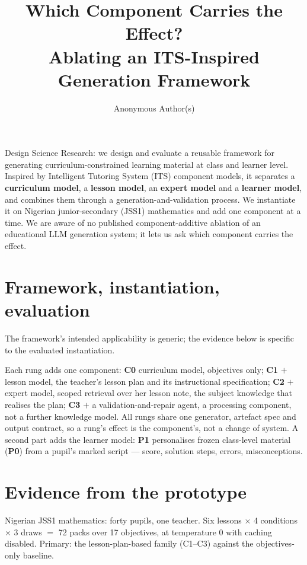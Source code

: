 \documentclass{article}
\title{Which Component Carries the Effect?\\
Ablating an ITS-Inspired Generation Framework}
\author{Anonymous Author(s)}
\begin{document}
\maketitle
\vspace{-2.7em}

\noindent
Design Science Research: we design and evaluate a reusable framework for generating
curriculum-constrained learning material at class and learner level. Inspired by
Intelligent Tutoring System (ITS) component models, it separates a \textbf{curriculum
model}, a \textbf{lesson model}, an \textbf{expert model} and a \textbf{learner model},
and combines them through a generation-and-validation process. We instantiate it on
Nigerian junior-secondary (JSS1) mathematics and add one component at a time. We are aware
of no published component-additive ablation of an educational LLM generation system; it
lets us ask which component carries the effect.

\vspace{-0.78em}
\section{Framework, instantiation, evaluation}
\vspace{-0.52em}
The framework's intended applicability is generic; the evidence below is specific to the
evaluated instantiation.

Each rung adds one component: \textbf{C0} curriculum model, objectives only;
\textbf{C1} $+$ lesson model, the teacher's lesson plan and its instructional
specification; \textbf{C2} $+$ expert model, scoped retrieval over her lesson note, the
subject knowledge that realises the plan; \textbf{C3} $+$ a validation-and-repair agent,
a processing component, not a further knowledge model. All rungs share one
generator, artefact spec and output contract, so a rung's effect is the component's, not a
change of system. A second part adds the learner model:
\textbf{P1} personalises frozen class-level material (\textbf{P0}) from a pupil's marked
script --- score, solution steps, errors, misconceptions.

\vspace{-0.78em}
\section{Evidence from the prototype}
\vspace{-0.52em}
Nigerian JSS1 mathematics: forty pupils, one teacher. Six lessons $\times$ 4 conditions
$\times$ 3 draws $=$ 72 packs over 17 objectives, at
temperature 0 with caching disabled. Primary: the lesson-plan-based family
(C1--C3) against the objectives-only baseline.
\end{document}
